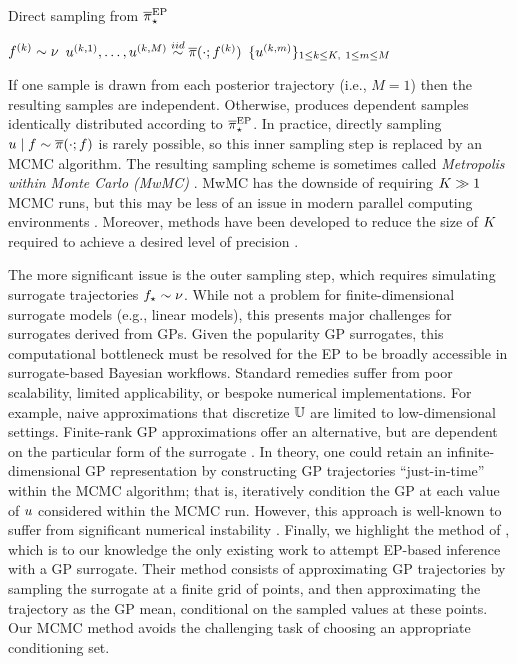 \documentclass[12pt]{article}
\begin{document}
\begin{algorithm}[H]
    \caption{Direct sampling from ${\overline{\pi}}_{\star}^{\mathrm{EP}}$}
    \label{alg:ep}
    \begin{algorithmic}[1]
        		\State $f^{(k)} \sim \nu$ 
		\State $u^{(k, 1)}, \dots, u^{(k, M)} \overset{iid}{\sim} \overline{\pi}(\cdot; f^{(k)})$ 
	\EndFor
	\State \Return $\{u^{(k, m)}\}_{1 \leq k \leq K, \ 1 \leq m \leq M}$
	\EndFunction
    \end{algorithmic}
\end{algorithm}
If one sample is drawn from each posterior trajectory (i.e., $M=1$) then the resulting samples are 
independent. Otherwise,  produces dependent samples identically distributed according to
${\overline{\pi}}_{\star}^{\mathrm{EP}}$. In practice, directly sampling $u \mid f \sim \overline{\pi}(\cdot; f)$
is rarely possible, so this inner sampling step is replaced by an MCMC algorithm.
The resulting sampling scheme is sometimes called \textit{Metropolis within Monte Carlo (MwMC)} 
\citep{garegnani2021NoisyMCMC}. MwMC has the downside of requiring $K \gg 1$
MCMC runs, but this may be less of an issue in modern parallel computing environments \citep{BurknerSurrogate}. 
Moreover, methods have been developed to reduce the size of $K$ required to achieve a
desired level of precision \citep{BurknerTwoStep}. 

The more significant issue is the outer sampling step, which requires simulating surrogate 
trajectories ${f}_{\star} \sim \nu$. While not a problem for finite-dimensional 
surrogate models (e.g., linear models), this presents major challenges for surrogates 
derived from GPs. Given the popularity GP surrogates, 
this computational bottleneck must be resolved for the EP to be broadly accessible in 
surrogate-based Bayesian workflows. Standard remedies suffer from poor scalability,
limited applicability, or bespoke numerical implementations. For example, naive 
approximations that discretize $\mathbb{U}$ are limited to low-dimensional settings.
Finite-rank GP approximations offer an alternative, but are dependent on the 
particular form of the surrogate \citep{pathwiseConditioning}. In theory, one 
could retain an infinite-dimensional GP representation by constructing 
GP trajectories ``just-in-time'' within the MCMC algorithm; that is, iteratively
condition the GP at each value of $u$ considered within the MCMC run.
However, this approach is well-known to suffer from significant numerical 
instability \citep{pathwiseConditioning}. Finally, we highlight the method of 
\citet{trainDynamics}, which is to our knowledge the only existing work to 
attempt EP-based inference with a GP surrogate. 
Their method consists of approximating GP 
trajectories by sampling the surrogate at a finite grid of points, 
and then approximating the trajectory as the GP mean, conditional on the 
sampled values at these points. Our MCMC method avoids the challenging 
task of choosing an appropriate conditioning set.
\end{document}
